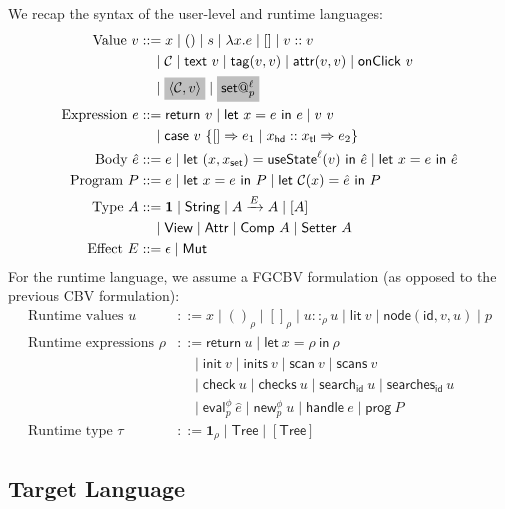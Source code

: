 \documentclass{article}
\makeatletter
\newcommand{\mf}[1]{\mathsf{#1}}
\newcommand{\mc}[1]{\mathcal{#1}}
\newcommand{\mb}[1]{\mathbf{#1}}
\newcommand{\mgrey}[1]{\colorbox{lightgray}{$#1$}}
\newcommand{\pair}[2]{\langle #1, #2 \rangle}
\newcommand{\arrow}[1]{\xrightarrow{#1}}
\newcommand{\ptp}{A}
\newcommand{\rtp}{\tau}
\newcommand{\tone}{\mb{1}}
\newcommand{\tstr}{\mf{String}}
\newcommand{\tview}{\mf{View}}
\newcommand{\tattr}{\mf{Attr}}
\newcommand{\tcomp}[1]{\mf{Comp}\ #1}
\newcommand{\tset}[1]{\mf{Setter}\ #1}
\newcommand{\emut}{\mf{Mut}}
\newcommand{\ttree}{\mf{Tree}}
\newcommand{\C}{\mc{C}}
\newcommand{\vtxt}[1]{\mf{text}\ #1}
\newcommand{\vtag}[2]{\mf{tag}(#1, #2)}
\newcommand{\vattr}[2]{\mf{attr}(#1, #2)}
\newcommand{\vclick}[1]{\mf{onClick}\ #1}
\newcommand{\vset}[2]{\mf{set}@^{#1}_{#2}}
\newcommand{\elet}[3]{\mf{let}\ #1 = #2\ \mf{in}\ #3}
\newcommand{\eret}[1]{\mf{return}\ #1}
\newcommand{\ecase}[5]{\mf{case}\ #1\ \{#2 \Rightarrow #3 \mid #4 \Rightarrow #5\}}
\newcommand{\estate}[4]{\mf{let}\ (#1, #1_{\mf{set}}) = \mf{useState}^{#2}(#3)\ \mf{in}\ #4}
\newcommand{\elit}[1]{\mf{lit}\ #1}
\newcommand{\enode}[3]{\mf{node}(\mf{#1}, #2, #3)}
\newcommand{\esearch}[2]{\mf{search}_\mf{#1}\ #2}
\newcommand{\esearches}[2]{\mf{searches}_\mf{#1}\ #2}
\newcommand{\eeval}[3]{\mf{eval}^{#1}_{#2}\ #3}
\newcommand{\enew}[3]{\mf{new}^{#1}_{#2}\ #3}
\newcommand{\ehdl}[1]{\mf{handle}\ #1}
\newcommand{\eprog}[1]{\mf{prog}\ #1}
\newcommand{\einit}[1]{\mf{init}\ #1}
\newcommand{\einits}[1]{\mf{inits}\ #1}
\newcommand{\escan}[1]{\mf{scan}\ #1}
\newcommand{\escans}[1]{\mf{scans}\ #1}
\newcommand{\echk}[1]{\mf{check}\ #1}
\newcommand{\echks}[1]{\mf{checks}\ #1}
\makeatother
\begin{document}
We recap the syntax of the user-level and runtime languages:
\begin{align*}
\text{Value } v &::= x \mid () \mid s \mid \lambda x.e \mid [] \mid v :: v\\
&\quad\mid \C \mid \vtxt{v} \mid \vtag{v}{v}
\mid \vattr{v}{v} \mid \vclick{v}\\
&\quad\mid \mgrey{\pair{\C}{v}} \mid \mgrey{\vset{\ell}{p}}\\
\text{Expression } e &::= \eret{v} \mid \elet{x}{e}{e} \mid v\ v \\
&\quad\mid \ecase{v}{[]}{e_1}{x_\mf{hd} :: x_\mf{tl}}{e_2}\\
\text{Body }\hat{e} &::= e \mid \estate{x}{\ell}{v}{\hat{e}} \mid \elet{x}{e}{\hat{e}}\\
\text{Program } P &::= e \mid \elet{x}{e}{P} \mid \elet{\C(x)}{\hat{e}}{P}\\
\text{Type } \ptp &::= \tone \mid \tstr \mid \ptp \arrow{E} \ptp
\mid [\ptp] \\
&\quad\mid \tview \mid \tattr
\mid \tcomp{\ptp} \mid \tset{\ptp}\\
\text{Effect } E &::= \epsilon \mid \emut
\end{align*}
For the runtime language, we assume a FGCBV formulation
(as opposed to the previous CBV formulation):
\begin{align*}
\text{Runtime values } u
&::= x \mid ()_\rho \mid []_\rho \mid u ::_\rho u
\mid \elit{v} \mid \enode{id}{v}{u}
\mid p\\
\text{Runtime expressions } \rho
&::= \eret{u} \mid \elet{x}{\rho}{\rho}\\
&\quad\mid
\einit{v} \mid \einits{v} \mid \escan{v} \mid \escans{v}\\
&\quad\mid \echk{u} \mid \echks{u}
\mid \esearch{id}{u} \mid \esearches{id}{u}\\
&\quad\mid \eeval{\phi}{p}{\hat{e}} \mid \enew{\phi}{p}{u}
\mid \ehdl{e} \mid \eprog{P}\\
\text{Runtime type } \rtp &::= \tone_\rho \mid \mf{Tree}
\mid [\ttree]
\end{align*}

\subsection{Target Language}
\end{document}
